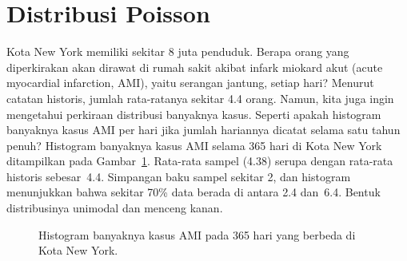 

{}





\section{Distribusi Poisson}
\label{poisson}


\begin{examplewrap}
\begin{nexample}{Kota New York memiliki sekitar 8 juta penduduk.
    Berapa orang yang diperkirakan akan dirawat di rumah sakit
    akibat infark miokard akut (acute myocardial infarction, AMI), yaitu serangan jantung,
    setiap hari?
    Menurut catatan historis, jumlah rata-ratanya
    sekitar 4.4 orang.
    Namun, kita juga ingin mengetahui perkiraan
    distribusi banyaknya kasus.
    Seperti apakah histogram banyaknya kasus AMI
    per hari jika jumlah hariannya dicatat selama
    satu tahun penuh?}
  \label{amiIncidencesEachDayOver1YearInNYCExample}%
  Histogram banyaknya kasus AMI selama 365 hari
  di Kota New York ditampilkan pada
  Gambar~\ref{amiIncidencesOver100Days}.\footnotemark{}
  Rata-rata sampel (4.38) serupa dengan rata-rata historis
  sebesar~4.4.
  Simpangan baku sampel sekitar 2, dan histogram
  menunjukkan bahwa sekitar 70\% data berada di antara 2.4 dan~6.4.
  Bentuk distribusinya unimodal dan menceng kanan.
\end{nexample}
\end{examplewrap}

\begin{figure}[h]
  \centering
  \caption{Histogram banyaknya kasus AMI
      pada 365 hari yang berbeda di Kota New York.}
  \label{amiIncidencesOver100Days}
\end{figure}

